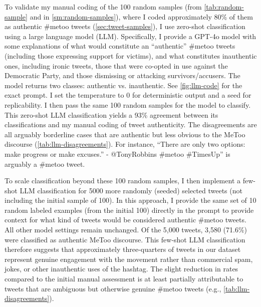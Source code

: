 \documentclass[manuscript,screen,nonacm,11pt,acm]{acmart}
\begin{document}
\begin{bibunit}
To validate my manual coding of the 100 random samples (from \cref{tab:random-sample} and  in \cref{sm:random-samples}), where I coded approximately 80\% of them as authentic \#metoo tweets (\cref{sec:tweet-samples}), I use zero-shot classification using a large language model (LLM).
Specifically, I provide a GPT-4o model with some explanations of what would constitute an ``authentic'' \#metoo tweets (including those expressing support for victims), and what constitutes inauthentic ones, including ironic tweets, those that were co-opted in use against the Democratic Party, and those dismissing or attacking survivors/accusers.
The model returns two classes: authentic vs. inauthentic.
See \cref{fig:llm-code} for the exact prompt.
I set the temperature to 0 for deterministic output and a seed for replicability.
I then pass the same 100 random samples for the model to classify.
This zero-shot LLM classification yields a 93\% agreement between its classifications and my manual coding of tweet authenticity.
The disagreements are all arguably borderline cases that are authentic but less obvious to the MeToo discourse (\cref{tab:llm-disagreements}).
For instance, ``There are only two options: make progress or make excuses.'' - @TonyRobbins \#metoo \#TimesUp'' is arguably a \#metoo tweet.

To scale classification beyond these 100 random samples, I then implement a few-shot LLM classification for 5000 more randomly (seeded) selected tweets (not including the initial sample of 100).
In this approach, I provide the same set of 10 random labeled examples (from the initial 100) directly in the prompt to provide context for what kind of tweets would be considered authentic \#metoo tweets.
All other model settings remain unchanged.
Of the 5,000 tweets, 3,580 (71.6\%) were classified as authentic MeToo discourse.
This few-shot LLM classification therefore suggests that approximately three-quarters of tweets in our dataset represent genuine engagement with the movement rather than commercial spam, jokes, or other inauthentic uses of the hashtag.
The slight reduction in rates compared to the initial manual assessment is at least partially attributable to tweets that are ambiguous but otherwise genuine \#metoo tweets (e.g., \cref{tab:llm-disagreements}).



\end{bibunit}
\end{document}

